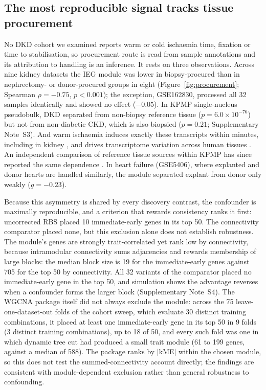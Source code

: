 \documentclass[unnumsec,webpdf,contemporary,large,numbered]{oup-authoring-template}
\begin{document}
\subsection{The most reproducible signal tracks tissue procurement}\label{sec:procurement}

No DKD cohort we examined reports warm or cold ischaemia time, fixation or time to stabilisation,
so procurement route is read from sample annotations and its attribution to handling is an
inference. It rests on three observations. Across nine kidney datasets the IEG module was lower in
biopsy-procured than in nephrectomy- or donor-procured groups in eight (Figure~\ref{fig:procurement};
Spearman $\rho = -0.75$, $p < 0.001$); the exception, GSE162830, processed all 32 samples
identically and showed no effect ($-0.05$). In KPMP single-nucleus pseudobulk, DKD separated from
non-biopsy reference tissue ($p = 6.0\times10^{-76}$) but not from non-diabetic CKD, which is also
biopsied ($p = 0.21$; Supplementary Note~S3). And warm ischaemia induces exactly these transcripts
within minutes, including in kidney \cite{ma2012}, and drives transcriptome variation across human
tissues \cite{ferreira2018}. An independent comparison of reference tissue sources within KPMP has
since reported the same dependence \cite{menon2026}. In heart failure (GSE5406), where explanted
and donor hearts are handled similarly, the module separated explant from donor only weakly
($g = -0.23$).

Because this asymmetry is shared by every discovery contrast, the confounder is maximally
reproducible, and a criterion that rewards consistency ranks it first: uncorrected RBS placed 10
immediate-early genes in its top 50. The connectivity comparator placed none, but this exclusion
alone does not establish robustness. The
module's genes are strongly trait-correlated yet rank low by connectivity, because
intramodular connectivity sums adjacencies and rewards membership of large blocks: the median
block size is 19 for the immediate-early genes against 705 for the top 50 by connectivity. All 32
variants of the comparator placed no immediate-early gene in the top 50, and simulation shows the
advantage reverses when a confounder forms the larger block (Supplementary Note~S4). The WGCNA
package itself did not always exclude the module: across the 75 leave-one-dataset-out folds of the
cohort sweep, which evaluate 30 distinct training combinations, it placed at least one
immediate-early gene in its top 50 in 9 folds (3 distinct training combinations), up to 18 of 50,
and every such fold was one in which dynamic tree cut had produced a small trait module (61 to 199
genes, against a median of 588). The package ranks by $|$kME$|$ within the chosen module, so this
does not test the summed-connectivity account directly; the findings are consistent with
module-dependent exclusion rather than general robustness to confounding.
\end{document}
